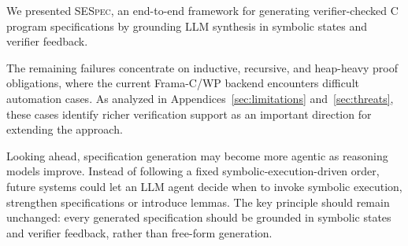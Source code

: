 \documentclass[lettersize,journal]{IEEEtran}
\def\revcolor{blue}
\DeclareRobustCommand{\rev}[1]{{\color{\revcolor}#1}}
\newcommand{\toolname}{\textsc{SESpec}}
\newcommand{\apptworef}[2]{Appendices~\ref{#1} and~\ref{#2}}
\begin{document}



We presented \toolname, an end-to-end framework for generating verifier-checked C program specifications by grounding LLM synthesis in symbolic states and verifier feedback.

\rev{The remaining failures concentrate on inductive, recursive, and heap-heavy proof obligations, where the current Frama-C/WP backend encounters difficult automation cases. As analyzed in \apptworef{sec:limitations}{sec:threats}, these cases identify richer verification support as an important direction for extending the approach.}

Looking ahead, specification generation may become more agentic as reasoning models improve. Instead of following a fixed symbolic-execution-driven order, future systems could let an LLM agent decide when to invoke symbolic execution, strengthen specifications or introduce lemmas. The key principle should remain unchanged: every generated specification should be grounded in symbolic states and verifier feedback, rather than free-form generation.
\end{document}
